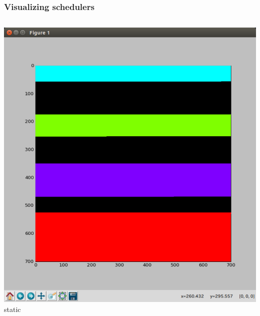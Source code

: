 \documentclass[12pt,dvipdfmx]{beamer}
\begin{document}
\begin{frame}
\frametitle{Visualizing schedulers}
\begin{columns}
\begin{column}{0.5\textwidth}
\includegraphics[width=\textwidth]{out/pdf/img/load_balance_static.pdf}
\vskip-2mm
{\footnotesize static}
\end{column}


\end{columns}
\end{frame}
\end{document}
